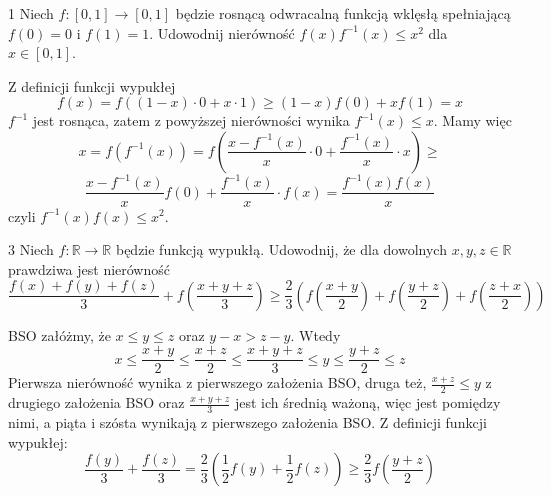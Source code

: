 \documentclass{../note}
\begin{document}
\begin{zadanie}{1}
Niech $f:[0,1]\rightarrow[0,1]$ będzie rosnącą odwracalną funkcją wklęsłą spełniającą $f(0)=0$ i $f(1)=1$. Udowodnij nierówność $f(x)f^{-1}(x)\le x^{2}$ dla $x\in[0,1]$.
\end{zadanie}
\begin{rozwiazanie}
Z definicji funkcji wypukłej
\[f(x) = f((1-x)\cdot 0 + x\cdot 1) \geq (1-x)f(0) + xf(1) = x\]
$f^{-1}$ jest rosnąca, zatem z powyższej nierówności wynika $f^{-1}(x) \leq x$. Mamy więc
\[x = f(f^{-1}(x)) = f\left(\frac{x-f^{-1}(x)}{x} \cdot 0 + \frac{f^{-1}(x)}{x}\cdot x\right) \geq\]\[ \frac{x-f^{-1}(x)}{x}f(0) + \frac{f^{-1}(x)}{x}\cdot f(x) = \frac{f^{-1}(x)f(x)}{x}\]
czyli $f^{-1}(x)f(x) \leq x^2$.
\end{rozwiazanie}

\begin{zadanie}{3}
Niech $f:\mathbb{R}\rightarrow\mathbb{R}$ będzie funkcją wypukłą. Udowodnij, że dla dowolnych $x,y,z\in\mathbb{R}$ prawdziwa jest nierówność
$$
\frac{f(x)+f(y)+f(z)}{3}+f\left(\frac{x+y+z}{3}\right)\ge\frac{2}{3}\left(f\left(\frac{x+y}{2}\right)+f\left(\frac{y+z}{2}\right)+f\left(\frac{z+x}{2}\right)\right)
$$
\end{zadanie}
\begin{rozwiazanie}
BSO załóżmy, że $x \leq y \leq z$ oraz $y - x > z - y$. Wtedy
\[x \leq \frac{x+y}{2} \leq \frac{x + z}{2} \leq \frac{x + y + z}{3} \leq y \leq \frac{y+z}{2} \leq z\]
Pierwsza nierówność wynika z pierwszego założenia BSO, druga też, $\frac{x + z}{2} \leq y$ z drugiego założenia BSO oraz $\frac{x + y + z}{3}$ jest ich średnią ważoną, więc jest pomiędzy nimi, a piąta i szósta wynikają z pierwszego założenia BSO. Z definicji funkcji wypukłej:
\begin{equation}
\frac{f(y)}{3} + \frac{f(z)}{3} = \frac23\left(\frac12f(y) + \frac12f(z)\right) \geq \frac23f(\frac{y+z}{2})
\end{equation}
\end{rozwiazanie}
\end{document}
